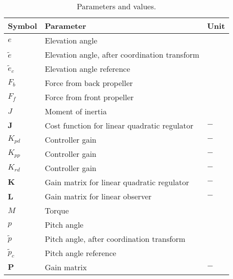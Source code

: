 \begin{table}[h!]
	\centering
	\caption{Parameters and values.}
	\begin{tabular}{lll}
		\toprule
		Symbol & Parameter & Unit \\
		\midrule
		$e$         & Elevation angle                                   & \rad                        \\
		$\tilde{e}$ & Elevation angle, after coordination transform     & \rad                        \\
		$\tilde{e}_c$ & Elevation angle reference                       & \rad                        \\
		$F_b$       & Force from back propeller                         & \newton                     \\
		$F_f$       & Force from front propeller                        & \newton                     \\
		$J$         & Moment of inertia                                 & \kilogram\meter\squared     \\
		$\bm{J}$    & Cost function for linear quadratic regulator      & $-$                         \\
		$K_{pd}$    & Controller gain                                   & $-$                         \\
		$K_{pp}$    & Controller gain                                   & $-$                         \\
		$K_{rd}$    & Controller gain                                   & $-$                         \\
		$\bm{K}$    & Gain matrix for linear quadratic regulator        & $-$                         \\
		$\bm{L}$    & Gain matrix for linear observer                   & $-$                         \\
		$M$         & Torque                                            & \newton\meter               \\
		$p$         & Pitch angle                                       & \rad                        \\
		$\tilde{p}$ & Pitch angle, after coordination transform         & \rad                        \\
		$\tilde{p}_c$ & Pitch angle reference                           & \rad                        \\
		$\bm{P}$    & Gain matrix                                       & $-$                         \\

\end{tabular}
\end{table}
